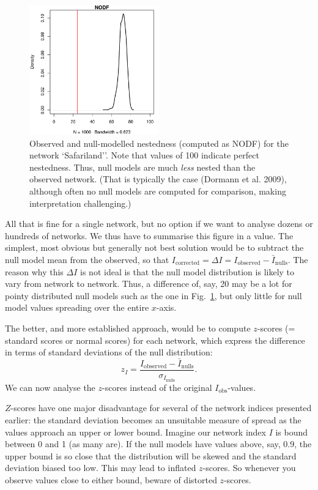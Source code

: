 \documentclass[a4paper, 11pt]{article}\usepackage[]{graphicx}\usepackage[dvipsnames]{xcolor}
\newcommand{\ind}[1]{#1\index{#1}}           			   %
\begin{document}
\begin{figure}
\centering
\includegraphics[width=0.5\textwidth]{figures/NODFnull}
\caption{Observed and null-modelled nestedness (computed as NODF) for the network `Safariland''. Note that values of 100 indicate perfect nestedness. 
Thus, null models are much \emph{less} nested than the observed network. (That is typically the case (Dormann et al. 2009), although often no null models are computed for comparison, making interpretation challenging.)}
\label{fig:NODFnull}
\end{figure}
%
All that is fine for a single network, but no option if we want to analyse dozens or hundreds of networks. We thus have to summarise this figure in a value. The simplest, most obvious but generally not best solution would be to subtract the null model mean from the observed, so that $I_\text{corrected} = \Delta I= I_\text{observed} - \bar{I}_\text{nulls}$. The reason why this $\Delta I$ is not ideal is that the null model distribution is likely to vary from network to network. Thus, a difference of, say, 20 may be a lot for pointy distributed null models such as the one in Fig.~\ref{fig:NODFnull}, but only little for null model values spreading over the entire $x$-axis.

The better, and more established approach, would be to compute $z$-scores (= \ind{standard score}s or \ind{normal score}s) for each network, which express the difference in terms of standard deviations of the null distribution: 
\[z_I= \frac{I_\text{observed} - \bar{I}_\text{nulls}}{\sigma_{I_\text{nulls}}}.\] We can now analyse the $z$-scores instead of the original $I_\text{obs}$-values.

$Z$-scores have one major disadvantage for several of the network indices presented earlier: the standard deviation becomes an unsuitable measure of spread as the values approach an upper or lower bound. Imagine our network index $I$ is bound between 0 and 1 (as many are). If the null models have values above, say, 0.9, the upper bound is so close that the distribution will be skewed and the standard deviation biased too low. This may lead to inflated $z$-scores. So whenever you observe values close to either bound, beware of distorted $z$-scores.
\end{document}
